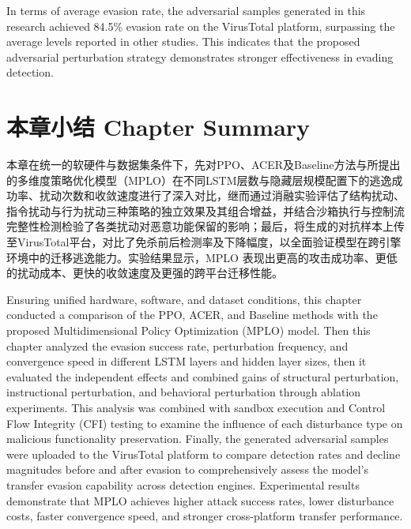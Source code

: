 In terms of average evasion rate, the adversarial samples generated in this research achieved 84.5\% evasion rate on the VirusTotal platform, surpassing the average levels reported in other studies. This indicates that the proposed adversarial perturbation strategy demonstrates stronger effectiveness in evading detection.

\section{本章小结 Chapter Summary}

本章在统一的软硬件与数据集条件下，先对PPO、ACER及Baseline方法与所提出的多维度策略优化模型（MPLO）在不同LSTM层数与隐藏层规模配置下的逃逸成功率、扰动次数和收敛速度进行了深入对比，继而通过消融实验评估了结构扰动、指令扰动与行为扰动三种策略的独立效果及其组合增益，并结合沙箱执行与控制流完整性检测检验了各类扰动对恶意功能保留的影响；最后，将生成的对抗样本上传至VirusTotal平台，对比了免杀前后检测率及下降幅度，以全面验证模型在跨引擎环境中的迁移逃逸能力。实验结果显示，MPLO 表现出更高的攻击成功率、更低的扰动成本、更快的收敛速度及更强的跨平台迁移性能。

Ensuring unified hardware, software, and dataset conditions, this chapter conducted a comparison of the PPO, ACER, and Baseline methods with the proposed Multidimensional Policy Optimization (MPLO) model. Then this chapter analyzed the evasion success rate, perturbation frequency, and convergence speed in different LSTM layers and hidden layer sizes, then it evaluated the independent effects and combined gains of structural perturbation, instructional perturbation, and behavioral perturbation through ablation experiments. This analysis was combined with sandbox execution and Control Flow Integrity (CFI) testing to examine the influence of each disturbance type on malicious functionality preservation. Finally, the generated adversarial samples were uploaded to the VirusTotal platform to compare detection rates and decline magnitudes before and after evasion to comprehensively assess the model's transfer evasion capability across detection engines. Experimental results demonstrate that MPLO achieves higher attack success rates, lower disturbance costs, faster convergence speed, and stronger cross-platform transfer performance.
